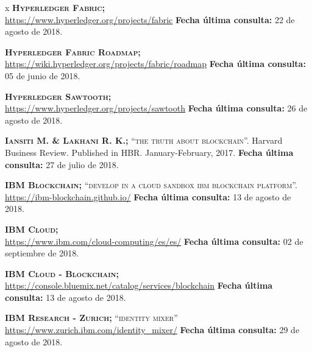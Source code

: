 \begin{thebibliography} {x}
	 \textsc{\textbf{Hyperledger Fabric; }} \\ 
	\url{https://www.hyperledger.org/projects/fabric} 
	\newline \textbf{Fecha última consulta:} 22 de agosto de 2018.
	
	 \textsc{\textbf{Hyperledger Fabric Roadmap; }} \\ 
	\url{https://wiki.hyperledger.org/projects/fabric/roadmap} 
	\newline \textbf{Fecha última consulta:} 05 de junio de 2018.
	
	 \textsc{\textbf{Hyperledger Sawtooth; }} \\ 
	\url{https://www.hyperledger.org/projects/sawtooth} 
	\newline \textbf{Fecha última consulta:} 26 de agosto de 2018.
				
	 \textsc{\textbf{Iansiti M. \& Lakhani R. K.; }}\textsc{“the truth about blockchain”.} Harvard Business Review. Published in HBR. January-February, 2017. 
	\newline \textbf{Fecha última consulta:} 27 de julio de 2018.
	
	 \textsc{\textbf{IBM Blockchain; }} \textsc{“develop in a cloud sandbox ibm blockchain platform”.} 
	\url{https://ibm-blockchain.github.io/} 
	\newline \textbf{Fecha última consulta:} 13 de agosto de 2018.
	
	 \textsc{\textbf{IBM Cloud; }} \\ 
	\url{https://www.ibm.com/cloud-computing/es/es/} 
	\newline \textbf{Fecha última consulta:} 02 de septiembre de 2018.
		
	 \textsc{\textbf{IBM Cloud - Blockchain; }} \\ 
	\url{https://console.bluemix.net/catalog/services/blockchain} 
	\newline \textbf{Fecha última consulta:} 13 de agosto de 2018.
	
	\textsc{\textbf{IBM Research - Zurich; }} \textsc{“identity mixer”} \\
	\url{https://www.zurich.ibm.com/identity_mixer/} 
	\newline \textbf{Fecha última consulta:} 29 de agosto de 2018.
	

\end{thebibliography}
